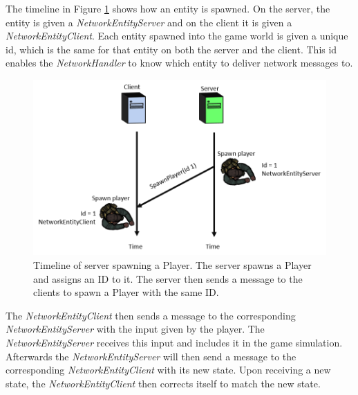 The timeline in Figure \ref{fig:clientServerEntities} shows how an entity is spawned.
On the server, the entity is given a \emph{NetworkEntityServer} and on the client it is given a \emph{NetworkEntityClient}.
Each entity spawned into the game world is given a unique id, which is the same for that entity on both the server and the client.
This id enables the \emph{NetworkHandler} to know which entity to deliver network messages to.

\begin{figure}[H]
\centering
\includegraphics[scale=1]{figures/network/clientServerEntities}
\caption{Timeline of server spawning a Player. The server spawns a Player and assigns an ID to it. The server then sends a message to the clients to spawn a Player with the same ID.}
\label{fig:clientServerEntities}
\end{figure}

The \emph{NetworkEntityClient} then sends a message to the corresponding \emph{NetworkEntityServer} with the input given by the player.
The \emph{NetworkEntityServer} receives this input and includes it in the game simulation.
Afterwards the \emph{NetworkEntityServer} will then send a message to the corresponding \emph{NetworkEntityClient} with its new state.
Upon receiving a new state, the \emph{NetworkEntityClient} then corrects itself to match the new state.
